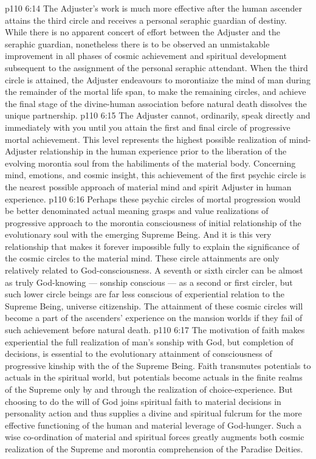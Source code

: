 \vs p110 6:14 \pc {} The Adjuster’s work is much more effective after the human ascender attains the third circle and receives a personal seraphic guardian of destiny. While there is no apparent concert of effort between the Adjuster and the seraphic guardian, nonetheless there is to be observed an unmistakable improvement in all phases of cosmic achievement and spiritual development subsequent to the assignment of the personal seraphic attendant. When the third circle is attained, the Adjuster endeavours to morontiaize the mind of man during the remainder of the mortal life span, to make the remaining circles, and achieve the final stage of the divine\hyp{}human association before natural death dissolves the unique partnership.
\vs p110 6:15 \pc {} The Adjuster cannot, ordinarily, speak directly and immediately with you until you attain the first and final circle of progressive mortal achievement. This level represents the highest possible realization of mind\hyp{}Adjuster relationship in the human experience prior to the liberation of the evolving morontia soul from the habiliments of the material body. Concerning mind, emotions, and cosmic insight, this achievement of the first psychic circle is the nearest possible approach of material mind and spirit Adjuster in human experience.
\vs p110 6:16 \pc Perhaps these psychic circles of mortal progression would be better denominated  actual meaning grasps and value realizations of progressive approach to the morontia consciousness of initial relationship of the evolutionary soul with the emerging Supreme Being. And it is this very relationship that makes it forever impossible fully to explain the significance of the cosmic circles to the material mind. These circle attainments are only relatively related to God\hyp{}consciousness. A seventh or sixth circler can be almost as truly God\hyp{}knowing --- sonship conscious --- as a second or first circler, but such lower circle beings are far less conscious of experiential relation to the Supreme Being, universe citizenship. The attainment of these cosmic circles will become a part of the ascenders’ experience on the mansion worlds if they fail of such achievement before natural death.
\vs p110 6:17 The motivation of faith makes experiential the full realization of man’s sonship with God, but  completion of decisions, is essential to the evolutionary attainment of consciousness of progressive kinship with the  of the Supreme Being. Faith transmutes potentials to actuals in the spiritual world, but potentials become actuals in the finite realms of the Supreme only by and through the realization of choice\hyp{}experience. But choosing to do the will of God joins spiritual faith to material decisions in personality action and thus supplies a divine and spiritual fulcrum for the more effective functioning of the human and material leverage of God\hyp{}hunger. Such a wise co\hyp{}ordination of material and spiritual forces greatly augments both cosmic realization of the Supreme and morontia comprehension of the Paradise Deities.
